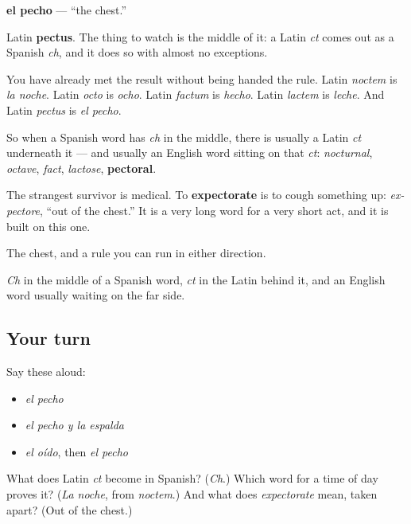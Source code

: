 \begin{cousinweb}
\textbf{el pecho} — \textquotedblleft{}the chest.\textquotedblright{}

Latin \textbf{pectus}. The thing to watch is the middle of it: a Latin \emph{ct} comes out as a Spanish \emph{ch}, and it does so with almost no exceptions.

You have already met the result without being handed the rule. Latin \emph{noctem} is \emph{la noche}. Latin \emph{octo} is \emph{ocho}. Latin \emph{factum} is \emph{hecho}. Latin \emph{lactem} is \emph{leche}. And Latin \emph{pectus} is \emph{el pecho}.

So when a Spanish word has \emph{ch} in the middle, there is usually a Latin \emph{ct} underneath it — and usually an English word sitting on that \emph{ct}: \emph{nocturnal}, \emph{octave}, \emph{fact}, \emph{lactose}, \textbf{pectoral}.

The strangest survivor is medical. To \textbf{expectorate} is to cough something up: \emph{ex-pectore}, \textquotedblleft{}out of the chest.\textquotedblright{} It is a very long word for a very short act, and it is built on this one.
\end{cousinweb}

\begin{grammarlens}[title={What you've built}]
The chest, and a rule you can run in either direction.

\emph{Ch} in the middle of a Spanish word, \emph{ct} in the Latin behind it, and an English word usually waiting on the far side.
\end{grammarlens}

\subsection*{Your turn}
Say these aloud:

\begin{itemize}
\raggedright
  \item \emph{el pecho}
  \item \emph{el pecho y la espalda}
  \item \emph{el oído}, then \emph{el pecho}
\end{itemize}

\begin{tcolorbox}[breakable,colback=teal!4,colframe=teal!35!black,title={Before you move on}]
What does Latin \emph{ct} become in Spanish? (\emph{Ch}.) Which word for a time of day proves it? (\emph{La noche}, from \emph{noctem}.) And what does \emph{expectorate} mean, taken apart? (Out of the chest.)
\end{tcolorbox}
